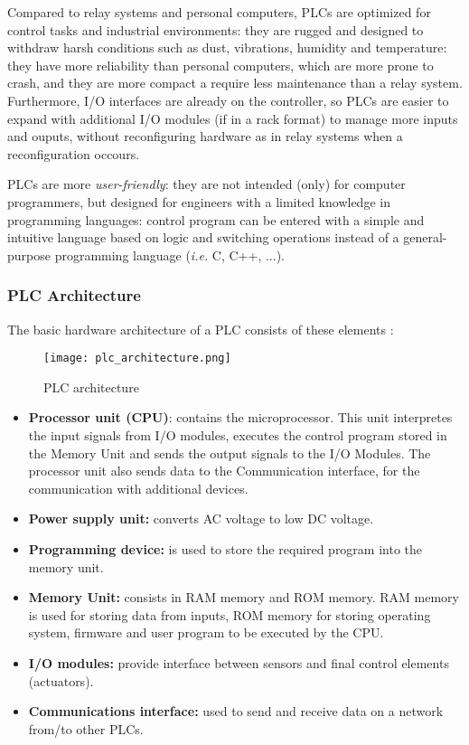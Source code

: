 \bigskip
Compared to relay systems and personal computers, PLCs are optimized for control tasks and industrial environments: they are rugged and designed to withdraw harsh conditions such as dust, vibrations, humidity and temperature: they have more reliability than personal computers, which are more prone to crash, and they are more compact a require less maintenance than a relay system.
Furthermore, I/O interfaces are already on the controller, so PLCs are easier to expand with additional I/O modules (if in a rack format) to manage more inputs and ouputs, without reconfiguring hardware as in relay systems when a reconfiguration occours. 

\bigskip
PLCs are more \textit{user-friendly}: they are not intended (only) for computer programmers, but designed for engineers with a limited knowledge in programming languages: control program can be entered with a simple and intuitive language based on logic and switching operations instead of a general-purpose programming language (\textit{i.e.} C, C++, ...). 

\subsubsection{PLC Architecture}
The basic hardware architecture of a PLC consists of these elements \cite{plc_book}:

\begin{figure}[h]
	\centering
	\texttt{[image: plc\_architecture.png]}
	\caption{PLC architecture}
	\label{fig:PLC_architecture}
\end{figure}

\begin{itemize}
	\item \textbf{Processor unit (CPU)}: contains the microprocessor. This unit interpretes the input signals from I/O modules, executes the control program stored in the Memory Unit and sends the output signals to the I/O Modules.
	The processor unit also sends data to the Communication interface, for the communication with additional devices.
	\item \textbf{Power supply unit:} converts AC voltage to low DC voltage.
	\item \textbf{Programming device:} is used to store the required program into the memory unit.
	\item \textbf{Memory Unit:} consists in RAM memory and ROM memory. RAM memory is used for storing data from inputs, ROM memory for storing operating system, firmware and user program to be executed by the CPU.
	\item \textbf{I/O modules:} provide interface between sensors and final control elements (actuators).
	\item \textbf{Communications interface:} used to send and receive data on a network from/to other PLCs.
\end{itemize}

